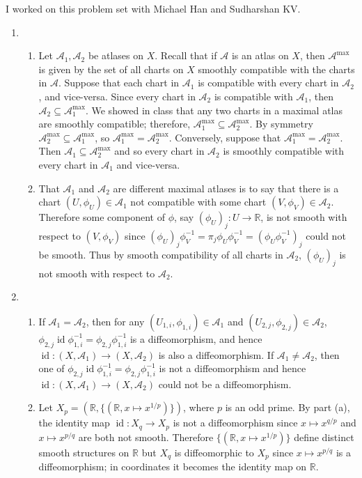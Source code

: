\documentclass[11pt,leqno]{article}
\theoremstyle{plain}
\theoremstyle{definition}
\numberwithin{equation}{section}
\numberwithin{lem}{section}
\DeclareMathOperator{\id}{id}
\begin{document}
I worked on this problem set with Michael Han and Sudharshan KV.
\begin{enumerate}
    \item \begin{enumerate}
        \item Let $\mathcal A_1,\mathcal A_2$ be atlases on $X$. Recall that if $\mathcal A$ is an atlas on $X$, then $\mathcal A^{\max}$ is given by the set of all charts on $X$ smoothly compatible with the charts in $\mathcal A$. Suppose that each chart in $\mathcal A_1$ is compatible with every chart in $\mathcal A_2$, and vice-versa. Since every chart in $\mathcal A_2$ is compatible with $\mathcal A_1$, then $\mathcal A_2 \subseteq \mathcal A_1^{\max}$. We showed in class that any two charts in a maximal atlas are smoothly compatible; therefore, $\mathcal A_1^{\max} \subseteq \mathcal A_2^{\max}$. By symmetry $\mathcal A_2^{\max} \subseteq \mathcal A_1^{\max}$, so $\mathcal A_1^{\max} = \mathcal A_2^{\max}$. Conversely, suppose that $\mathcal A_1^{\max} = \mathcal A_2^{\max}$. Then $\mathcal A_1\subseteq \mathcal A_2^{\max}$ and so every chart in $\mathcal A_2$ is smoothly compatible with every chart in $\mathcal A_1$ and vice-versa.
        \item That $\mathcal A_1$ and $\mathcal A_2$ are different maximal atlases is to say that there is a chart $(U,\phi_U)\in \mathcal A_1$ not compatible with some chart $(V,\phi_V)\in\mathcal A_2$. Therefore some component of $\phi$, say $(\phi_U)_j\colon U\to\mathbb R$, is not smooth with respect to $(V,\phi_V)$ since $(\phi_U)_j\phi_V^{-1} = \pi_j\phi_U\phi_V^{-1} = (\phi_U\phi_V^{-1})_j$ could not be smooth. Thus by smooth compatibility of all charts in $\mathcal A_2$, $(\phi_U)_j$ is not smooth with respect to $\mathcal A_2$.
    \end{enumerate}
    \item \begin{enumerate}
      \item If $\mathcal A_1=\mathcal A_2$, then for any $(U_{1,i},\phi_{1,i})\in\mathcal A_1$ and $(U_{2,j},\phi_{2,j})\in\mathcal A_2$, $\phi_{2,j}\id\phi_{1,i}^{-1} = \phi_{2,j}\phi_{1,i}^{-1}$ is a diffeomorphism, and hence $\id\colon (X,\mathcal A_1)\to (X,\mathcal A_2)$ is also a diffeomorphism. If $\mathcal A_1\neq \mathcal A_2$, then one of $\phi_{2,j}\id\phi_{1,i}^{-1} = \phi_{2,j}\phi_{1,i}^{-1}$ is not a diffeomorphism and hence $\id\colon (X,\mathcal A_1)\to (X,\mathcal A_2)$ could not be a diffeomorphism.
      \item Let $X_{p} = (\mathbb R,\{(\mathbb R, x\mapsto x^{1/p})\})$, where $p$ is an odd prime. By part (a), the identity map $\id\colon X_q\to X_p$ is not a diffeomorphism since $x\mapsto x^{q/p}$ and $x\mapsto x^{p/q}$ are both not smooth. Therefore $\{(\mathbb R, x\mapsto x^{1/p})\}$ define distinct smooth structures on $\mathbb R$ but $X_q$ is diffeomorphic to $X_p$ since $x\mapsto x^{p/q}$ is a diffeomorphism; in coordinates it becomes the identity map on $\mathbb R$.

\end{enumerate}
\end{enumerate}
\end{document}
